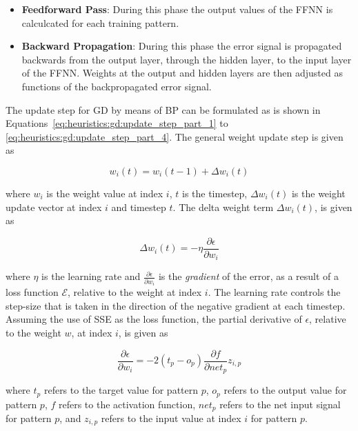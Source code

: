 \begin{itemize}
      \item \textbf{Feedforward Pass}: During this phase the output values of the \acs{FFNN} is calculcated for each training pattern.

      \item \textbf{Backward Propagation}: During this phase the error signal is propagated backwards from the output layer, through the hidden layer, to the input layer of the \acs{FFNN}. Weights at the output and hidden layers are then adjusted as functions of the backpropagated error signal.
\end{itemize}

The update step for \acs{GD} by means of \acs{BP} can be formulated as is shown in Equations~\eqref{eq:heuristics:gd:update_step_part_1} to \eqref{eq:heuristics:gd:update_step_part_4}. The general weight update step is given as

\begin{equation}
      \label{eq:heuristics:gd:update_step_part_1}
      w_{i}(t) = w_{i}(t-1) + \Delta w_{i}(t)
\end{equation}

where $w_{i}$ is the weight value at index $i$, $t$ is the timestep, $\Delta w_{i}(t)$ is the weight update vector at index $i$ and timestep $t$. The delta weight term $\Delta w_{i}(t)$, is given as

\begin{equation}
      \label{eq:heuristics:gd:update_step_part_2}
      \Delta w_{i}(t) = -\eta\frac{\partial \epsilon}{\partial w_{i}}
\end{equation}

where $\eta$ is the learning rate and $\frac{\partial \epsilon}{\partial w_{i}}$ is the \textit{gradient} of the error, as a result of a loss function $\mathcal{E}$, relative to the weight at index $i$. The learning rate controls the step-size that is taken in the direction of the negative gradient at each timestep. Assuming the use of \acs{SSE} as the loss function, the partial derivative of $\epsilon$, relative to the weight $w$, at index $i$, is given as

\begin{equation}
      \label{eq:heuristics:gd:update_step_part_3}
      \frac{\partial \epsilon}{\partial w_{i}} = -2(t_{p} - o_{p})\frac{\partial f}{\partial net_{p}}z_{i,p}
\end{equation}

where $t_{p}$ refers to the target value for pattern $p$, $o_{p}$ refers to the output value for pattern $p$, $f$ refers to the activation function, $net_{p}$ refers to the net input signal for pattern $p$, and $z_{i,p}$ refers to the input value at index $i$ for pattern $p$.

